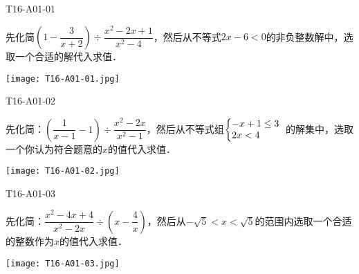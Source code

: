 
\begin{defproblem}{T16-A01-01}%
\begin{onlyproblem}%
先化简$\left(1-\dfrac{3}{x+2}\right)\div \dfrac{x^2-2x+1}{x^2-4}$，然后从不等式$2x-6<0$的非负整数解中，选取一个合适的解代入求值．
\end{onlyproblem}%
\begin{onlysolution}%
\texttt{[image: T16-A01-01.jpg]}
\end{onlysolution}%
\end{defproblem}


\begin{defproblem}{T16-A01-02}%
\begin{onlyproblem}%
先化简：$\left(\dfrac{1}{x-1}-1\right)\div \dfrac{x^2-2x}{x^2-1}$，然后从不等式组$\left\{\begin{array}{@{}l}
-x+1\le 3\\
2x<4\\
\end{array}\right.$的解集中，选取一个你认为符合题意的$x$的值代入求值．
\end{onlyproblem}%
\begin{onlysolution}%
\begin{center}
\texttt{[image: T16-A01-02.jpg]}
\end{center}
\end{onlysolution}%
\end{defproblem}


\begin{defproblem}{T16-A01-03}%
\begin{onlyproblem}%
先化简：$\dfrac{x^2-4x+4}{x^2-2x}\div\left(x-\dfrac{4}{x}\right)$，然后从$-\sqrt 5 <x<\sqrt 5 $的范围内选取一个合适的整数作为$x$的值代入求值．
\end{onlyproblem}%
\begin{onlysolution}%
\begin{center}
\texttt{[image: T16-A01-03.jpg]}
\end{center}
\end{onlysolution}%
\end{defproblem}


